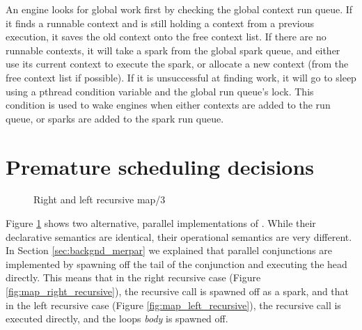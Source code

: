 An engine looks for global work first by checking the global context run queue.
If it finds a runnable context and is still holding a context from a
previous execution, it saves the old context onto the free context list.
If there are no runnable contexts,
it will take a spark from the global spark queue,
and either use its current context to execute the spark,
or allocate a new context (from the free context list if possible).
If it is unsuccessful at finding work,
it will go to sleep using a pthread condition variable and the global run
queue's lock.
This condition is used to wake engines when either contexts are added to the
run queue,
or sparks are added to the spark run queue.

\section{Premature scheduling decisions}


\begin{figure}
\begin{center}
%
\end{center}
\caption{Right and left recursive map/3}
\label{fig:map_right_and_left_recursive}
\end{figure}

Figure \ref{fig:map_right_and_left_recursive} shows two alternative, parallel
implementations of .
While their declarative semantics are identical,
their operational semantics are very different.  In Section
\ref{sec:backgnd_merpar} we explained that parallel conjunctions are
implemented by spawning off the tail of the conjunction and executing the
head directly.
This means that in the right recursive case (Figure
\ref{fig:map_right_recursive}), the recursive call is spawned off as a
spark,
and that in the left recursive case (Figure \ref{fig:map_left_recursive}),
the recursive call is executed directly, and the loops \emph{body} is
spawned off.

